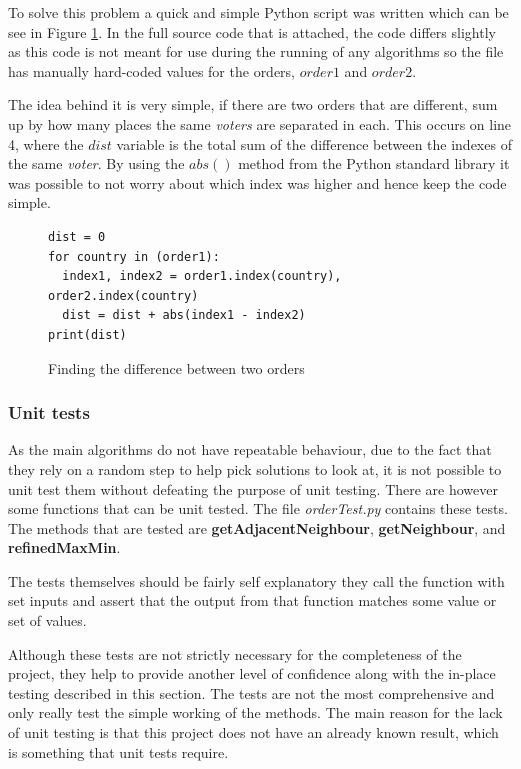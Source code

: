 \documentclass[12pt]{report}
\begin{document}
To solve this problem a quick and simple Python script was written which can be see in Figure \ref{orderDiff}. In the full source code that is attached, the code differs slightly as this code is not meant for use during the running of any algorithms so the file has manually hard-coded values for the orders, $order1$ and $order2$.

The idea behind it is very simple, if there are two orders that are different, sum up by how many places the same \textit{voters} are separated in each. This occurs on line 4, where the $dist$ variable is the total sum of the difference between the indexes of the same \textit{voter}. By using the $abs()$ method from the Python standard library it was possible to not worry about which index was higher and hence keep the code simple.

\begin{figure}[H]
\caption{Finding the difference between two orders}
\label{orderDiff}
\begin{lstlisting}
dist = 0
for country in (order1):
  index1, index2 = order1.index(country), order2.index(country)
  dist = dist + abs(index1 - index2)
print(dist)
\end{lstlisting}
\end{figure}

\subsubsection{Unit tests}
As the main algorithms do not have repeatable behaviour, due to the fact that they rely on a random step to help pick solutions to look at, it is not possible to unit test them without defeating the purpose of unit testing. There are however some functions that can be unit tested. The file \textit{orderTest.py} contains these tests. The methods that are tested are \textbf{getAdjacentNeighbour}, \textbf{getNeighbour}, and \textbf{refinedMaxMin}.

The tests themselves should be fairly self explanatory they call the function with set inputs and assert that the output from that function matches some value or set of values.

Although these tests are not strictly necessary for the completeness of the project, they help to provide another level of confidence along with the in-place testing described in this section. The tests are not the most comprehensive and only really test the simple working of the methods. The main reason for the lack of unit testing is that this project does not have an already known result, which is something that unit tests require. 
\end{document}
